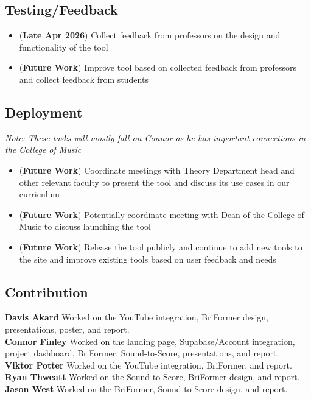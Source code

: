 \documentclass[12pt, letterpaper]{article}
\begin{document}
\subsection*{Testing/Feedback}
\begin{itemize}[label=$\square$]
    \item[$\checkmark$] (\textbf{Late Apr 2026}) Collect feedback from professors on the design and functionality of the tool
    \item[] (\textbf{Future Work}) Improve tool based on collected feedback from professors and collect feedback from students
\end{itemize}

\subsection*{Deployment}
\textit{Note: These tasks will mostly fall on Connor as he has important connections in the College of Music}
\begin{itemize}[label=$\square$]
    \item[] (\textbf{Future Work}) Coordinate meetings with Theory Department head and other relevant faculty to present the tool and discuss its use cases in our curriculum
    \item[] (\textbf{Future Work}) Potentially coordinate meeting with Dean of the College of Music to discuss launching the tool
    \item[] (\textbf{Future Work}) Release the tool publicly and continue to add new tools to the site and improve existing tools based on user feedback and needs 
\end{itemize}

\subsection*{Contribution}
\textbf{Davis Akard} Worked on the YouTube integration, BriFormer design, presentations, poster, and report. \\
\textbf{Connor Finley} Worked on the landing page, Supabase/Account integration, project dashboard, BriFormer, Sound-to-Score, presentations, and report. \\
\textbf{Viktor Potter} Worked on the YouTube integration, BriFormer, and report. \\
\textbf{Ryan Thweatt} Worked on the Sound-to-Score, BriFormer design, and report. \\
\textbf{Jason West} Worked on the BriFormer, Sound-to-Score design, and report. 
\end{document}
